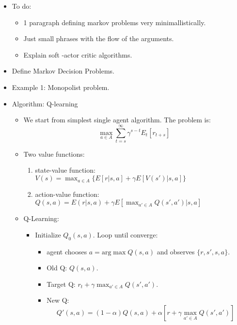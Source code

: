 \documentclass[11pt,english]{article}
\begin{document}
\begin{itemize}
	\item {\color{red} To do: 
	
	\begin{itemize}
		\item 1 paragraph defining markov problems very minimallistically. 
		\item Just small phrases with the flow of the arguments.
		\item Explain soft -actor critic algorithms.
\end{itemize}}
\item Define Markov Decision Problems.
\item Example 1: Monopolist problem.
\item Algorithm: Q-learning
\begin{itemize}
	\item We start from simplest single agent algorithm. The problem is: \medskip
	$$\underset{a \in A}{\max} \sum_{t=s}^{\infty} \gamma^{s-t} E_t[r_{t+s}]$$
	
	\item Two value functions: \medskip
	\begin{enumerate}
		\item state-value function: $V(s)=\max_{a\in A} \{E[r|s,a] + \gamma E[V(s')|s,a] \}$ \medskip
		\item action-value function: $Q(s,a)=E(r|s,a)+\gamma E[\max_{a'\in A} Q(s',a')|s,a]$ \medskip
	\end{enumerate}
	\item Q-Learning:  \medskip
	\begin{itemize}
		\item Initialize $Q_0(s,a)$. Loop until converge:  \medskip
		\begin{itemize}
			\item agent chooses $a= \text{arg} \max Q(s,a)$  and observes $\{r, s'  ,s, a\}$. \medskip
			\item Old Q: $Q(s,a)$. \medskip
			\item  Target Q: $r_t+\gamma \max_{a' \in A} Q(s',a')$. \medskip
			\item New Q: $$Q'(s,a)=(1-\alpha) Q(s,a) +\alpha [r+\gamma \max_{a' \in A} Q(s',a')]$$ \medskip
		\end{itemize}
	\end{itemize}
\end{itemize}


\end{itemize}
\end{document}
